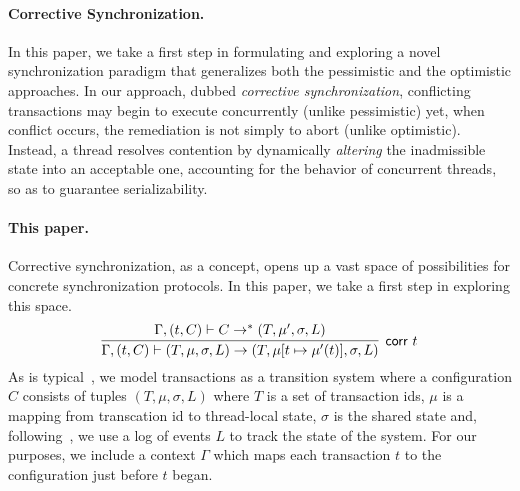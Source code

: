 \paragraph{Corrective Synchronization.}
In this paper, we take a first step in formulating and exploring a novel synchronization paradigm that generalizes both the pessimistic and the optimistic approaches.
%
In our approach, dubbed \emph{corrective synchronization}, conflicting transactions may begin to execute concurrently (unlike pessimistic) yet, when conflict occurs, the remediation is not simply to abort (unlike optimistic). Instead, a thread resolves contention by dynamically \emph{altering} the inadmissible state into an acceptable one, accounting for the behavior of concurrent threads, so as to guarantee serializability.





\paragraph{This paper.} Corrective synchronization, as a concept, opens up a vast space of possibilities for concrete synchronization protocols. In this paper, we take a first step in exploring this space.
%
$$
\infer[\text{{\sf corr }} t]{\Gamma, (t,C) \vdash (T, \mu, \sigma, L) \rightarrow (T,\mu[t \mapsto \mu'(t)], \sigma, L)}{
   \Gamma, (t,C) \vdash
	C \rightarrow^{*} (T,\mu', \sigma, L)}
$$
As is typical~\cite{Koskinen15,others}, we model transactions as a transition system
where a configuration $C$ consists of tuples $(T,\mu,\sigma,L)$ where
$T$ is a set of transaction ids,  $\mu$ is a mapping from
transcation id to thread-local state, $\sigma$ is the shared state
and, following~\cite{Koskinen15}, we use a log of events $L$ to track the
state of the system.
%
For our purposes, we include a context $\Gamma$ which maps each transaction
$t$ to the configuration just before $t$ began.

